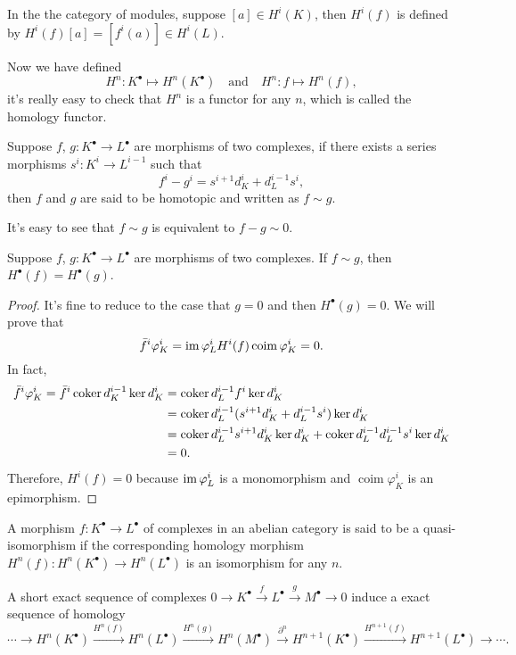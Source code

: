 In the the category of modules, suppose $[a]\in H^i(K)$, then $H^i(f)$ is
defined by $H^i(f)[a]=[f^i(a)]\in H^i(L)$.

Now we have defined 
\[
	H^n :K^\bullet\mapsto H^n(K^\bullet)\quad \text{and}\quad
	H^n :f\mapsto H^n(f),
\]
it's really easy to check that $H^n$ is a functor for any $n$, 
which is called the homology functor.

\begin{definition}
	Suppose $f$, $g:K^\bullet\to L^\bullet$ are morphisms of two complexes,
	if there exists a series morphisms $s^i:K^i\to L^{i-1}$ such that
	\[
		f^i-g^i=s^{i+1}d_K^i+d_L^{i-1}s^i,
	\]
	then $f$ and $g$ are said to be homotopic and written as $f\sim g$.
\end{definition}

It's easy to see that $f\sim g$ is equivalent to $f-g\sim 0$.

\begin{lem}\label{lem:1.7}
	Suppose $f$, $g:K^\bullet\to L^\bullet$ are morphisms of two complexes.
	If $f\sim g$, then $H^\bullet(f)=H^\bullet(g)$.
\end{lem}

\begin{proof}
	It's fine to reduce to the case that $g=0$ and then $H^\bullet(g)=0$. We will
	prove that
	\[
		\bar f^i \varphi_K^i = \operatorname{im} \varphi_L^i H^i(f) \operatorname{coim} \varphi_K^i=0.
	\]
	In fact,
	\[
		\begin{aligned}
		\bar f^i \varphi_K^i=\bar f^i \operatorname{coker} d_K^{i-1}\ker d_{K}^i 
		&=\operatorname{coker} d_L^{i-1} f^i\ker d_{K}^i\\
		&=\operatorname{coker} d_L^{i-1}(s^{i+1}d_K^i+d_L^{i-1}s^i)\ker d_{K}^i\\
		&=\operatorname{coker} d_L^{i-1}s^{i+1}d_K^i\ker d_{K}^i+\operatorname{coker} d_L^{i-1}d_L^{i-1}s^i\ker d_{K}^i\\
		&=0.
		\end{aligned}
	\]
	Therefore, $H^i(f) = 0$ because $\operatorname{im} \varphi_L^i$ is a monomorphism
	and $\operatorname{coim} \varphi_K^i$ is an epimorphism.
\end{proof}

\begin{definition}
	A morphism $f:K^\bullet\to L^\bullet$ of complexes in an abelian
	category is said to be a quasi-isomorphism if the corresponding 
	homology morphism $H^n(f):H^n(K^\bullet)\to H^n(L^\bullet)$
	is an isomorphism for any $n$.
\end{definition}

\begin{pro}\label{pro:1.9}
	A short exact sequence of complexes $0\to K^\bullet\xrightarrow{f}L^\bullet\xrightarrow{g}M^\bullet\to 0$ induce a exact sequence 
	of homology
	\[
		\cdots\to H^n(K^\bullet)\xrightarrow{H^n(f)}H^n(L^\bullet)\xrightarrow{H^n(g)}H^n(M^\bullet)\xrightarrow{\partial^n}H^{n+1}(K^\bullet)\xrightarrow{H^{n+1}(f)}H^{n+1}(L^\bullet)\to\cdots.
	\]
\end{pro}


